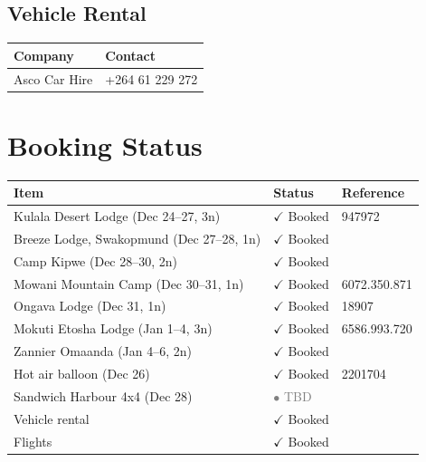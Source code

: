 \documentclass[11pt]{article}
\newcommand{\booked}{\textcolor{accentcolor}{$\checkmark$ Booked}}
\newcommand{\tbdstatus}{\textcolor{gray}{$\bullet$ TBD}}
\begin{document}
\subsection{Vehicle Rental}

\begin{tabular}{@{}ll@{}}
\toprule
\textbf{Company} & \textbf{Contact} \\
\midrule
Asco Car Hire & +264 61 229 272 \\
\bottomrule
\end{tabular}

\clearpage
\section{Booking Status}

\begin{tabular}{lll}
\toprule
\textbf{Item} & \textbf{Status} & \textbf{Reference} \\
\midrule
Kulala Desert Lodge (Dec 24--27, 3n) & \booked & 947972 \\
Breeze Lodge, Swakopmund (Dec 27--28, 1n) & \booked & \\
Camp Kipwe (Dec 28--30, 2n) & \booked & \\
Mowani Mountain Camp (Dec 30--31, 1n) & \booked & 6072.350.871 \\
Ongava Lodge (Dec 31, 1n) & \booked & 18907 \\
Mokuti Etosha Lodge (Jan 1--4, 3n) & \booked & 6586.993.720 \\
Zannier Omaanda (Jan 4--6, 2n) & \booked & \\
\midrule
Hot air balloon (Dec 26) & \booked & 2201704 \\
Sandwich Harbour 4x4 (Dec 28) & \tbdstatus & \\
\midrule
Vehicle rental & \booked & \\
Flights & \booked & \\
\bottomrule
\end{tabular}

\end{document}
